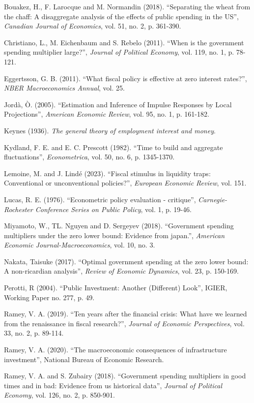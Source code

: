 \documentclass[12pt,letterpaper]{article}
\begin{document}
\begin{list}{}{\setlength{\leftmargin}{2em}\setlength{\itemindent}{-2em}\setlength{\itemsep}{0.3em}}
\item Bouakez, H., F. Larocque and M. Normandin (2018). ``Separating the wheat from the chaff: A disaggregate analysis of the effects of public spending in the US'', \emph{Canadian Journal of Economics}, vol. 51, no. 2, p. 361-390.
\item Christiano, L., M. Eichenbaum and S. Rebelo (2011). ``When is the government spending multiplier large?'', \emph{Journal of Political Economy}, vol. 119, no. 1, p. 78-121.
\item Eggertsson, G. B. (2011). ``What fiscal policy is effective at zero interest rates?'', \emph{NBER Macroeconomics Annual}, vol. 25.
\item Jord\`a, \`O. (2005). ``Estimation and Inference of Impulse Responses by Local Projections'', \emph{American Economic Review}, vol. 95, no. 1, p. 161-182.
\item Keynes (1936). \emph{The general theory of employment interest and money}.
\item Kydland, F. E. and E. C. Prescott (1982). ``Time to build and aggregate fluctuations'', \emph{Econometrica}, vol. 50, no. 6, p. 1345-1370.
\item Lemoine, M. and J. Lind\'e (2023). ``Fiscal stimulus in liquidity traps: Conventional or unconventional policies?'', \emph{European Economic Review}, vol. 151.
\item Lucas, R. E. (1976). ``Econometric policy evaluation - critique'', \emph{Carnegie-Rochester Conference Series on Public Policy}, vol. 1, p. 19-46.
\item Miyamoto, W., TL. Nguyen and D. Sergeyev (2018). ``Government spending multipliers under the zero lower bound: Evidence from japan.'', \emph{American Economic Journal-Macroeconomics}, vol. 10, no. 3.
\item Nakata, Taisuke (2017). ``Optimal government spending at the zero lower bound: A non-ricardian analysis'', \emph{Review of Economic Dynamics}, vol. 23, p. 150-169.
\item Perotti, R (2004). ``Public Investment: Another (Different) Look'', IGIER, Working Paper no. 277, p. 49.
\item Ramey, V. A. (2019). ``Ten years after the financial crisis: What have we learned from the renaissance in fiscal research?'', \emph{Journal of Economic Perspectives}, vol. 33, no. 2, p. 89-114.
\item Ramey, V. A. (2020). ``The macroeconomic consequences of infrastructure investment'', National Bureau of Economic Research.
\item Ramey, V. A. and S. Zubairy (2018). ``Government spending multipliers in good times and in bad: Evidence from us historical data'', \emph{Journal of Political Economy}, vol. 126, no. 2, p. 850-901.

\end{list}
\end{document}

